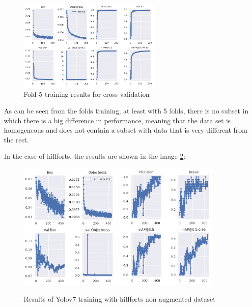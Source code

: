 \begin{figure}[H]
\centering
\includegraphics[width=7cm]{images/training/cross/04.png}
\caption{Fold 5 training results for cross validation}
\label{Fold 5 training results for cross validation}
\end{figure}

As can be seen from the folds training, at least with 5 folds, there is no subset in which there is a big difference in performance, meaning that the data set is homogeneous and does not contain a subset with data that is very different from the rest.


In the case of hillforts, the results are shown in the image \ref{Results of Yolov7 training with hillforts non augmented dataset}:

\begin{figure}[H]
    \centering
    {{\includegraphics[width=5cm]{images/training/castros/notaug1.png} }}
    \qquad
    {{\includegraphics[width=5cm]{images/training/castros/notaug2.png} }}
    \caption{Results of Yolov7 training with hillforts non augmented dataset}
    \label{Results of Yolov7 training with hillforts non augmented dataset}
\end{figure}


